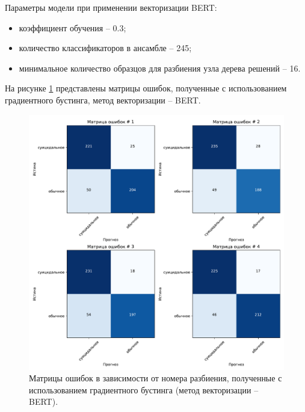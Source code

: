 Параметры модели при применении векторизации BERT:
\begin{itemize}
	\item коэффициент обучения -- 0.3;
	\item количество классификаторов в ансамбле -- 245;
	\item минимальное количество образцов для разбиения узла дерева решений -- 16.
\end{itemize}

На рисунке \ref{img:gradientMatrBert} представлены матрицы ошибок, полученные с использованием градиентного бустинга, метод векторизации -- BERT.
\begin{figure}[H]
	\centering
	\includegraphics[width=\textwidth]{inc/plots/gradientMatrBert.pdf}
	\caption{ Матрицы ошибок в зависимости от номера разбиения, полученные с использованием градиентного бустинга (метод векторизации -- BERT). }
	\label{img:gradientMatrBert}
\end{figure}

